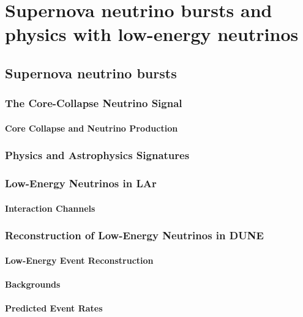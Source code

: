 \chapter{Supernova neutrino bursts and physics with low-energy neutrinos}
\label{ch:snb-lowe}


\section{Supernova neutrino bursts}
\label{sec:snb-lowe-snb}

\subsection{The Core-Collapse Neutrino Signal}

\subsubsection{Core Collapse and Neutrino Production}

\subsection{Physics and Astrophysics Signatures}

\subsection{Low-Energy Neutrinos in LAr}

\subsubsection{Interaction Channels}

\subsection{Reconstruction of Low-Energy Neutrinos in DUNE}

\subsubsection{Low-Energy Event Reconstruction}

\subsubsection{Backgrounds}

\subsubsection{Predicted Event Rates}


